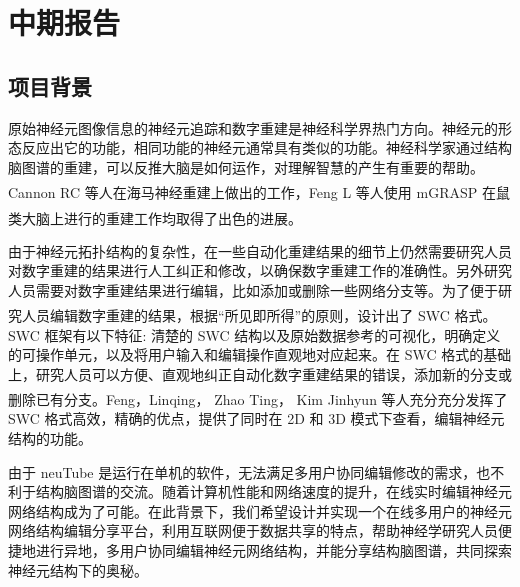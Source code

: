\newcommand{\upcite}[1]{\textsuperscript{\textsuperscript{\cite{#1}}}}
\chapter*{\zjutitlec 中期报告}

\section{项目背景}
原始神经元图像信息的神经元追踪和数字重建是神经科学界热门方向。神经元的形态反应出它的功能，相同功能的神经元通常具有类似的功能。神经科学家通过结构脑图谱的重建，可以反推大脑是如何运作，对理解智慧的产生有重要的帮助。Cannon RC 等人在海马神经重建上做出的工作\upcite{Cannon1998An}，Feng L 等人使用 mGRASP 在鼠类大脑上进行的重建工作\upcite{Druckmann2014Structured}均取得了出色的进展。

由于神经元拓扑结构的复杂性，在一些自动化重建结果的细节上仍然需要研究人员对数字重建的结果进行人工纠正和修改，以确保数字重建工作的准确性。另外研究人员需要对数字重建结果进行编辑，比如添加或删除一些网络分支等。为了便于研究人员编辑数字重建的结果，根据“所见即所得”的原则，设计出了 SWC 格式\upcite{Peng2011Proof}。SWC 框架有以下特征: 清楚的 SWC 结构以及原始数据参考的可视化，明确定义的可操作单元，以及将用户输入和编辑操作直观地对应起来。在 SWC 格式的基础上，研究人员可以方便、直观地纠正自动化数字重建结果的错误，添加新的分支或删除已有分支。Feng，Linqing， Zhao Ting， Kim Jinhyun 等人\upcite{Feng2014neuTube}充分充分发挥了 SWC 格式高效，精确的优点，提供了同时在 2D 和 3D 模式下查看，编辑神经元结构的功能。

由于 neuTube 是运行在单机的软件，无法满足多用户协同编辑修改的需求，也不利于结构脑图谱的交流。随着计算机性能和网络速度的提升，在线实时编辑神经元网络结构成为了可能。在此背景下，我们希望设计并实现一个在线多用户的神经元网络结构编辑分享平台，利用互联网便于数据共享的特点，帮助神经学研究人员便捷地进行异地，多用户协同编辑神经元网络结构，并能分享结构脑图谱，共同探索神经元结构下的奥秘。

